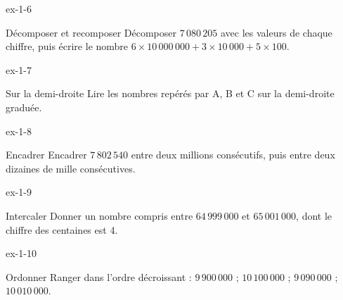 \begin{blocLivre}{ex-1-6}\begin{exercice}[2]{Décomposer et recomposer}
Décomposer $7\,080\,205$ avec les valeurs de chaque chiffre, puis écrire le nombre $6\times10\,000\,000+3\times10\,000+5\times100$.
\end{exercice}\end{blocLivre}
\begin{blocLivre}{ex-1-7}\begin{exercice}[2]{Sur la demi-droite}
Lire les nombres repérés par A, B et C sur la demi-droite graduée.
\label{fig-ex-1-7}
\end{exercice}\end{blocLivre}
\begin{blocLivre}{ex-1-8}\begin{exercice}[2]{Encadrer}
Encadrer $7\,802\,540$ entre deux millions consécutifs, puis entre deux dizaines de mille consécutives.
\end{exercice}\end{blocLivre}
\begin{blocLivre}{ex-1-9}\begin{exercice}[2]{Intercaler}
Donner un nombre compris entre $64\,999\,000$ et $65\,001\,000$, dont le chiffre des centaines est 4.
\end{exercice}\end{blocLivre}
\begin{blocLivre}{ex-1-10}\begin{exercice}[2]{Ordonner}
Ranger dans l’ordre décroissant : $9\,900\,000$ ; $10\,100\,000$ ; $9\,090\,000$ ; $10\,010\,000$.
\end{exercice}\end{blocLivre}

